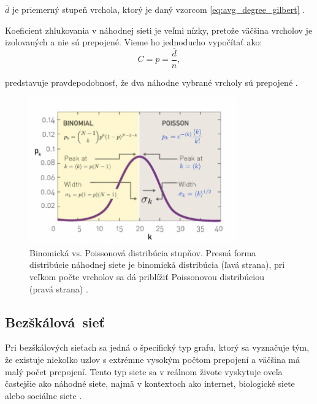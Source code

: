 $\bar{d}$ je priemerný stupeň vrchola, ktorý je daný vzorcom \ref{eq:avg_degree_gilbert} .

Koeficient zhlukovania v náhodnej sieti je veľmi nízky, pretože väčšina vrcholov je izolovaných a nie sú prepojené.
Vieme ho jednoducho vypočítať ako:
\begin{equation}
    C = p = \frac{\bar{d}}{n},
    \label{eq:clustering_coefficient_random}
\end{equation}

predstavuje pravdepodobnosť, že dva náhodne vybrané vrcholy sú prepojené \cite{barabasi2016network} .

\clearpage

\begin{figure}
    \centerline{\includegraphics[width=0.8\textwidth]{images/randomdegdist.png}}
    \caption[Binomická vs. Poissonová distribúcia stupňov.]{Binomická vs. Poissonová distribúcia stupňov.
    Presná forma distribúcie náhodnej siete je binomická distribúcia (ľavá strana), pri veľkom počte vrcholov sa
    dá priblížiť Poissonovou distribúciou (pravá strana) \cite{barabasi2016network} .}
    \label{obr:randomdegdist}
\end{figure}

\subsection{Bezškálová~sieť}\label{sec:scale-free-network}

Pri bezškálových sieťach sa jedná o špecifický typ grafu, ktorý sa vyznačuje tým, že existuje niekoľko uzlov
s extrémne vysokým počtom prepojení a väčšina má malý počet prepojení. Tento typ siete sa
v reálnom živote vyskytuje oveľa častejšie ako náhodné siete, najmä v kontextoch ako internet,
biologické siete alebo sociálne siete \cite{barabasi1999emergence} \cite{barabasi2016network} .

